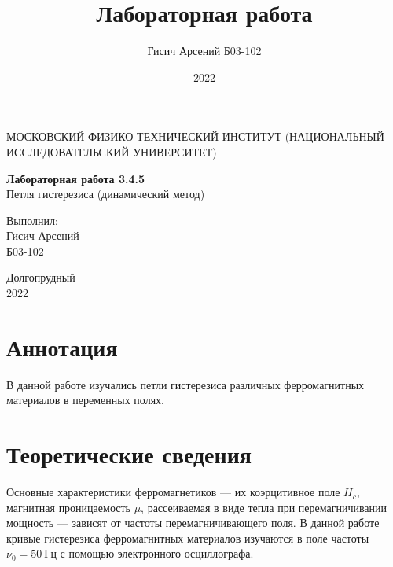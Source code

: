 \documentclass[a4paper, 12pt]{article}
\title{Лабораторная работа}
\author{Гисич Арсений Б03-102}
\date{2022}
\begin{document}
	\begin{center}
		{\large МОСКОВСКИЙ ФИЗИКО-ТЕХНИЧЕСКИЙ ИНСТИТУТ (НАЦИОНАЛЬНЫЙ ИССЛЕДОВАТЕЛЬСКИЙ УНИВЕРСИТЕТ)}
	\end{center}
	\vspace{5 cm}
	{\Large
		\begin{center}
			{\bf Лабораторная работа 3.4.5}\\[0.2 cm]
			Петля гистерезиса (динамический метод)
		\end{center}
	}
	\vspace{4 cm}
	\begin{flushright}
		{\Large Выполнил: \\
			\vspace{0.2 cm}
			Гисич Арсений \\
			\vspace{0.2 cm}
			Б03-102 \\}
	\end{flushright}
	\vspace{9 cm}
	\begin{center}
		Долгопрудный\\[0.1 cm]
		2022
	\end{center}
\thispagestyle{empty}

\section{Аннотация}

В данной работе изучались петли гистерезиса различных ферромагнитных материалов в переменных полях.

\section{Теоретические сведения}

Основные характеристики
ферромагнетиков — их коэрцитивное поле $H_c$, магнитная проницаемость
$\mu$, рассеиваемая в виде тепла при перемагничивании мощность — зависят
от частоты перемагничивающего поля. В данной работе кривые гистерезиса ферромагнитных материалов изучаются в поле частоты $\nu_0 = 50~Гц$
с помощью электронного осциллографа.
\end{document}
